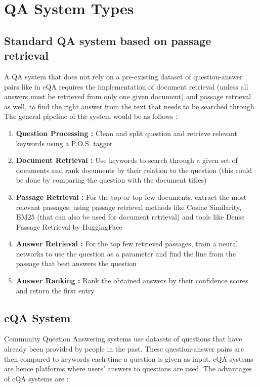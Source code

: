 \documentclass[12pt, a4paper]{article}
\begin{document}
\clearpage
\newpage 
\section{QA System Types} 

\subsection{Standard QA system based on passage retrieval} 
A QA system that does not rely on a pre-existing dataset of question-answer pairs like in cQA requires the implementation of document retrieval (unless all answers must be retrieved from only one given document) and passage retrieval as well, to find the right answer from the text that needs to be searched through. The general pipeline of the system would be as follows : 

\begin{enumerate}
    \item \textbf{Question Processing :} Clean and split question and retrieve relevant keywords using a P.O.S. tagger 
    \item \textbf{Document Retrieval :} Use keywords to search through a given set of documents and rank documents by their relation to the question (this could be done by comparing the question with the document titles) 
    \item \textbf{Passage Retrieval :} For the top or top few documents, extract the most relevant passages, using passage retrieval methods like Cosine Similarity, BM25 (that can also be used for document retrieval) and tools like Dense Passage Retrieval by HuggingFace 
    \item \textbf{Answer Retrieval :} For the top few retrieved passages, train a neural networks to use the question as a parameter and find the line from the passage that best answers the question 
    \item \textbf{Answer Ranking :} Rank the obtained answers by their confidence scores and return the first entry 
\end{enumerate}

\subsection{cQA System} 

Community Question Answering systems use datasets of questions that have already been provided by people in the past. These question-answer pairs are then compared to keywords each time a question is given as input. cQA systems are hence platforms where users' answers to questions are used. The advantages of cQA systems are : 
\end{document}
